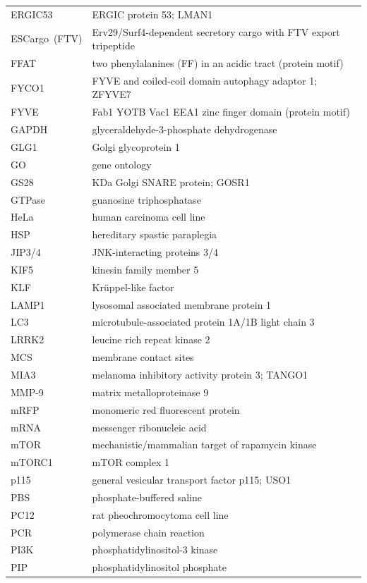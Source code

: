 \documentclass[
  12pt,
  a4paper,
]{book}
\begin{document}
\begin{longtable}[]{@{}
  >{\raggedright\arraybackslash}p{}
  >{\raggedright\arraybackslash}p{}@{}}
ERGIC53 & ERGIC protein 53; LMAN1 \\
ESCargo~(FTV) & Erv29/Surf4-dependent secretory cargo with FTV export tripeptide \\
FFAT & two phenylalanines (FF) in an acidic tract (protein motif) \\
FYCO1 & FYVE and coiled-coil domain autophagy adaptor 1; ZFYVE7 \\
FYVE & Fab1 YOTB Vac1 EEA1 zinc finger domain (protein motif) \\
GAPDH & glyceraldehyde-3-phosphate dehydrogenase \\
GLG1 & Golgi glycoprotein 1 \\
GO & gene ontology \\
GS28 & 28 KDa Golgi SNARE protein; GOSR1 \\
GTPase & guanosine triphosphatase \\
HeLa & human carcinoma cell line \\
HSP & hereditary spastic paraplegia \\
JIP3/4 & JNK-interacting proteins 3/4 \\
KIF5 & kinesin family member 5 \\
KLF & Krüppel-like factor \\
LAMP1 & lysosomal associated membrane protein 1 \\
LC3 & microtubule-associated protein 1A/1B light chain 3 \\
LRRK2 & leucine rich repeat kinase 2 \\
MCS & membrane contact sites \\
MIA3 & melanoma inhibitory activity protein 3; TANGO1 \\
MMP-9 & matrix metalloproteinase 9 \\
mRFP & monomeric red fluorescent protein \\
mRNA & messenger ribonucleic acid \\
mTOR & mechanistic/mammalian target of rapamycin kinase \\
mTORC1 & mTOR complex 1 \\
p115 & general vesicular transport factor p115; USO1 \\
PBS & phosphate-buffered saline \\
PC12 & rat pheochromocytoma cell line \\
PCR & polymerase chain reaction \\
PI3K & phosphatidylinositol-3 kinase \\
PIP & phosphatidylinositol phosphate \\

\end{longtable}
\end{document}
